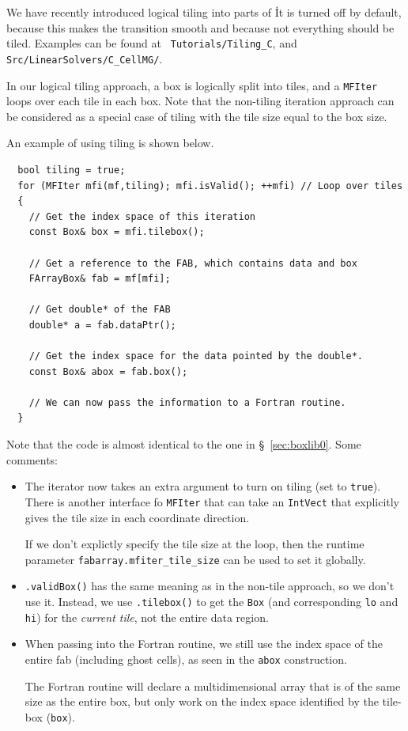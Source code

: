 We have recently introduced logical tiling into parts of \boxlib\.  It
is turned off by default, because this makes the transition smooth and
because not everything should be tiled.  Examples can be found at {\tt
  Tutorials/Tiling\_C}, and {\tt Src/LinearSolvers/C\_CellMG/}.

In our logical tiling approach, a box is logically split into tiles,
and a {\tt MFIter} loops over each tile in each box.  Note that the
non-tiling iteration approach can be considered as a special case of
tiling with the tile size equal to the box size.

An example of using tiling is shown below.

\begin{lstlisting}
  bool tiling = true;
  for (MFIter mfi(mf,tiling); mfi.isValid(); ++mfi) // Loop over tiles
  {
    // Get the index space of this iteration
    const Box& box = mfi.tilebox(); 

    // Get a reference to the FAB, which contains data and box  
    FArrayBox& fab = mf[mfi];  

    // Get double* of the FAB 
    double* a = fab.dataPtr();

    // Get the index space for the data pointed by the double*.
    const Box& abox = fab.box();

    // We can now pass the information to a Fortran routine.
  }
\end{lstlisting}
Note that the code is almost identical to the one in \S~\ref{sec:boxlib0}.
Some comments:
\begin{itemize}
\item The iterator now takes an extra argument to turn on tiling
(set to {\tt true}).  There is another interface fo {\tt MFIter}
that can take an {\tt IntVect} that explicitly gives the tile size
in each coordinate direction.

If we don't explictly specify the tile size at the loop, then the
runtime parameter {\tt fabarray.mfiter\_tile\_size} can be used to set it
globally.

\item {\tt .validBox()} has the same meaning as in the non-tile approach,
so we don't use it.  Instead, we use {\tt .tilebox()} to get the
{\tt Box} (and corresponding {\tt lo} and {\tt hi}) for the {\em
current tile}, not the entire data region.

\item When passing into the Fortran routine, we still use the
index space of the entire fab (including ghost cells), as seen in
the {\tt abox} construction.

The Fortran routine will declare a multidimensional array that is of
the same size as the entire box, but only work on the index space
identified by the tile-box ({\tt box}).
\end{itemize}

